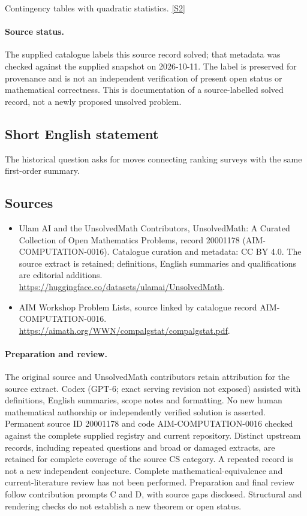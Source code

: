 \documentclass[11pt]{article}
\newcommand{\sref}[2]{\hyperlink{source:#1:#2}{[S#2]}}
\begin{document}
Contingency tables with quadratic statistics. \sref{20001178}{2}
\paragraph{Source status.}
The supplied catalogue labels this source record solved; that metadata was checked against the supplied snapshot on 2026-10-11. The label is preserved for provenance and is not an independent verification of present open status or mathematical correctness. This is documentation of a source-labelled solved record, not a newly proposed unsolved problem.
\subsection{Short English statement}
The historical question asks for moves connecting ranking surveys with the same first-order summary.
\subsection{Sources}
\begin{itemize}
\item[\hypertarget{source:20001178:1}{S1}] Ulam AI and the UnsolvedMath Contributors, UnsolvedMath: A Curated Collection of Open Mathematics Problems, record 20001178 (AIM-COMPUTATION-0016). Catalogue curation and metadata: CC BY 4.0. The source extract is retained; definitions, English summaries and qualifications are editorial additions.
\url{https://huggingface.co/datasets/ulamai/UnsolvedMath}.
\item[\hypertarget{source:20001178:2}{S2}] AIM Workshop Problem Lists, source linked by catalogue record AIM-COMPUTATION-0016.
\url{https://aimath.org/WWN/compalgstat/compalgstat.pdf}.
\end{itemize}
\paragraph{Preparation and review.}
The original source and UnsolvedMath contributors retain attribution for the source extract. Codex (GPT-6; exact serving revision not exposed) assisted with definitions, English summaries, scope notes and formatting. No new human mathematical authorship or independently verified solution is asserted. Permanent source ID 20001178 and code AIM-COMPUTATION-0016 checked against the complete supplied registry and current repository. Distinct upstream records, including repeated questions and broad or damaged extracts, are retained for complete coverage of the source CS category. A repeated record is not a new independent conjecture. Complete mathematical-equivalence and current-literature review has not been performed. Preparation and final review follow contribution prompts C and D, with source gaps disclosed. Structural and rendering checks do not establish a new theorem or open status.
\label{end:20001178}
\end{document}
